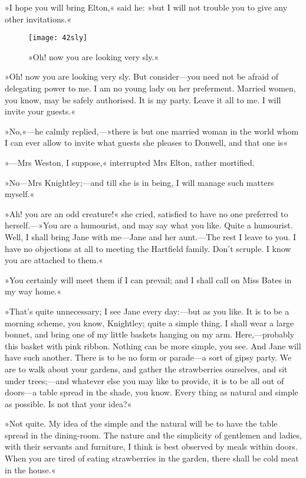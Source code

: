 »I hope you will bring Elton,« said he: »but I will not trouble you to give any other invitations.«

\begin{figure}[tbph]
\centering
\texttt{[image: 42sly]}
\caption{»Oh! now you are looking very sly.«}
\end{figure}


»Oh! now you are looking very sly. But consider—you need not be afraid of delegating power to me. I am no young lady on her preferment. Married women, you know, may be safely authorised. It is my party. Leave it all to me. I will invite your guests.«

»No,«—he calmly replied,—»there is but one married woman in the world whom I can ever allow to invite what guests she pleases to Donwell, and that one is\longdash«

»—Mrs Weston, I suppose,« interrupted Mrs Elton, rather mortified.

»No—Mrs Knightley;—and till she is in being, I will manage such matters myself.«

»Ah! you are an odd creature!« she cried, satisfied to have no one preferred to herself.—»You are a humourist, and may say what you like. Quite a humourist. Well, I shall bring Jane with me—Jane and her aunt.—The rest I leave to you. I have no objections at all to meeting the Hartfield family. Don't scruple. I know you are attached to them.«

»You certainly will meet them if I can prevail; and I shall call on Miss Bates in my way home.«

»That's quite unnecessary; I see Jane every day:—but as you like. It is to be a morning scheme, you know, Knightley; quite a simple thing. I shall wear a large bonnet, and bring one of my little baskets hanging on my arm. Here,—probably this basket with pink ribbon. Nothing can be more simple, you see. And Jane will have such another. There is to be no form or parade—a sort of gipsy party. We are to walk about your gardens, and gather the strawberries ourselves, and sit under trees;—and whatever else you may like to provide, it is to be all out of doors—a table spread in the shade, you know. Every thing as natural and simple as possible. Is not that your idea?«

»Not quite. My idea of the simple and the natural will be to have the table spread in the dining-room. The nature and the simplicity of gentlemen and ladies, with their servants and furniture, I think is best observed by meals within doors. When you are tired of eating strawberries in the garden, there shall be cold meat in the house.«

